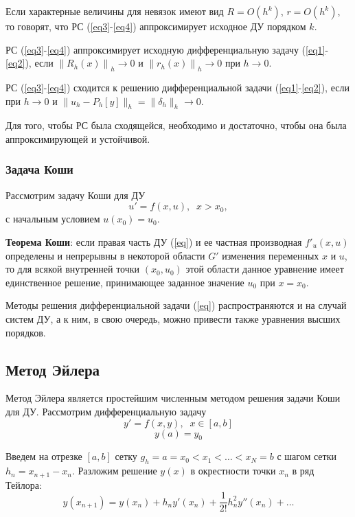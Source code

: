\documentclass[
11pt,
master, %
subf, %
href, %
colorlinks=true, %
times, %
]{disser}
\begin{document}
Если характерные величины для невязок имеют вид $R = O(h^k)$, $r = O(h^k)$, то говорят, что РС (\ref{eq3}-\ref{eq4}) аппроксимирует исходное ДУ порядком $k$.

РС (\ref{eq3}-\ref{eq4}) аппроксимирует исходную дифференциальную задачу (\ref{eq1}-\ref{eq2}), если $\left\|R_h(x)\right\|_h \rightarrow 0$ и $\left\|r_h(x)\right\|_h \rightarrow 0$ при $h\rightarrow 0$.

РС (\ref{eq3}-\ref{eq4}) сходится к решению дифференциальной задачи (\ref{eq1}-\ref{eq2}), если при $h\rightarrow 0$ и $\|u_h - P_h[y]\|_h = \|\delta_h\|_h \rightarrow 0$.

Для того, чтобы РС была сходящейся, необходимо и достаточно, чтобы она была аппроксимирующей и устойчивой.

\subsubsection{Задача Коши}
Рассмотрим задачу Коши для ДУ
\begin{equation}\label{eq}
  u' = f(x,u),\;\;x > x_0,
\end{equation}
с начальным условием $u(x_0) = u_0$.

\textbf{Теорема Коши}: если правая часть ДУ (\ref{eq}) и ее частная производная $f'_u(x,u)$ определены и непрерывны в некоторой области $G'$ изменения переменных $x$ и $u$, то для
всякой внутренней точки $(x_0, u_0)$ этой области данное уравнение
имеет единственное решение, принимающее заданное значение $u_0$ при $x = x_0$.

Методы решения дифференциальной задачи (\ref{eq}) распространяются и на случай систем ДУ, а к ним, в свою очередь, можно привести также уравнения высших порядков.

\subsection{Метод Эйлера}
Метод Эйлера является простейшим численным методом решения задачи Коши для ДУ. Рассмотрим дифференциальную задачу
\begin{equation}\label{eq6}
  y' = f(x,y),\;\;x\in[a,b]
\end{equation}
\begin{equation}\label{eq7}
  y(a) = y_0
\end{equation}

Введем на отрезке $[a,b]$ сетку $g_h = {a = x_0 < x_1 < \ldots < x_N = b}$ с шагом сетки $h_n = x_{n+1} - x_n$. Разложим решение $y(x)$ в окрестности точки $x_n$ в ряд Тейлора:
\begin{equation}\label{eq8}
  y(x_{n+1}) = y(x_n) + h_n y'(x_n) + \frac{1}{2!} h^2_n y''(x_n) + \ldots
\end{equation}
\end{document}
